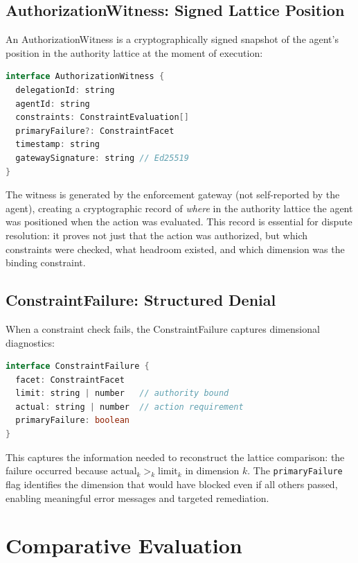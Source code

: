 \documentclass[sigconf,nonacm]{acmart}
\begin{document}
\subsection{AuthorizationWitness: Signed Lattice Position}

An AuthorizationWitness is a cryptographically signed snapshot of the agent's position
in the authority lattice at the moment of execution:

\begin{lstlisting}[language=Java,caption=AuthorizationWitness type]
interface AuthorizationWitness {
  delegationId: string
  agentId: string
  constraints: ConstraintEvaluation[]
  primaryFailure?: ConstraintFacet
  timestamp: string
  gatewaySignature: string // Ed25519
}
\end{lstlisting}

The witness is generated by the enforcement gateway (not self-reported by the agent),
creating a cryptographic record of \emph{where} in the authority lattice the agent was
positioned when the action was evaluated. This record is essential for dispute resolution:
it proves not just that the action was authorized, but which constraints were checked,
what headroom existed, and which dimension was the binding constraint.

\subsection{ConstraintFailure: Structured Denial}

When a constraint check fails, the ConstraintFailure captures dimensional diagnostics:

\begin{lstlisting}[language=Java,caption=ConstraintFailure type]
interface ConstraintFailure {
  facet: ConstraintFacet
  limit: string | number   // authority bound
  actual: string | number  // action requirement
  primaryFailure: boolean
}
\end{lstlisting}

This captures the information needed to reconstruct the lattice comparison: the failure
occurred because $\text{actual}_k >_k \text{limit}_k$ in dimension $k$. The
\texttt{primaryFailure} flag identifies the dimension that would have blocked even if all
others passed, enabling meaningful error messages and targeted remediation.

\section{Comparative Evaluation}
\end{document}
